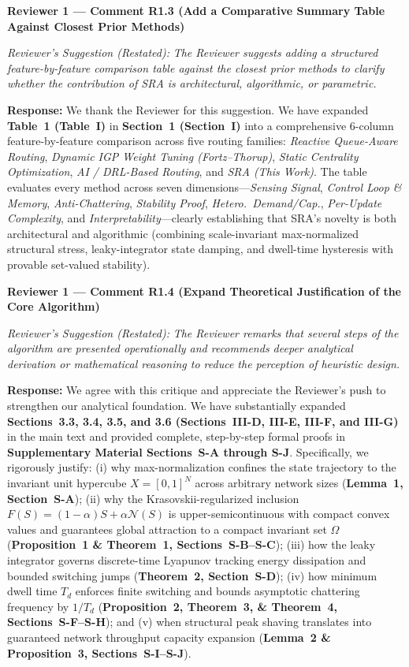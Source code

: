 \documentclass[11pt,a4paper]{article}
\newcommand{\cbox}[2]{%
  \vspace{0.6em}\noindent\textbf{#1}\par\smallskip
  \noindent\textit{Reviewer's Suggestion (Restated):} \textit{#2}\par\smallskip
}
\begin{document}
\hrulefill

\cbox{Reviewer 1 --- Comment R1.3 (Add a Comparative Summary Table Against Closest Prior Methods)}{The Reviewer suggests adding a structured feature-by-feature comparison table against the closest prior methods to clarify whether the contribution of SRA is architectural, algorithmic, or parametric.}

\noindent\textbf{Response:} We thank the Reviewer for this suggestion. We have expanded \textbf{Table~1 (Table~I)} in \textbf{Section~1 (Section~I)} into a comprehensive 6-column feature-by-feature comparison across five routing families: \textit{Reactive Queue-Aware Routing}, \textit{Dynamic IGP Weight Tuning (Fortz--Thorup)}, \textit{Static Centrality Optimization}, \textit{AI / DRL-Based Routing}, and \textit{SRA (This Work)}. The table evaluates every method across seven dimensions---\textit{Sensing Signal}, \textit{Control Loop \& Memory}, \textit{Anti-Chattering}, \textit{Stability Proof}, \textit{Hetero.\ Demand/Cap.}, \textit{Per-Update Complexity}, and \textit{Interpretability}---clearly establishing that SRA's novelty is both architectural and algorithmic (combining scale-invariant max-normalized structural stress, leaky-integrator state damping, and dwell-time hysteresis with provable set-valued stability).

\hrulefill

\cbox{Reviewer 1 --- Comment R1.4 (Expand Theoretical Justification of the Core Algorithm)}{The Reviewer remarks that several steps of the algorithm are presented operationally and recommends deeper analytical derivation or mathematical reasoning to reduce the perception of heuristic design.}

\noindent\textbf{Response:} We agree with this critique and appreciate the Reviewer's push to strengthen our analytical foundation. We have substantially expanded \textbf{Sections~3.3, 3.4, 3.5, and 3.6 (Sections~III-D, III-E, III-F, and III-G)} in the main text and provided complete, step-by-step formal proofs in \textbf{Supplementary Material Sections~S-A through S-J}. Specifically, we rigorously justify: (i) why max-normalization confines the state trajectory to the invariant unit hypercube $X=[0,1]^N$ across arbitrary network sizes (\textbf{Lemma~1, Section~S-A}); (ii) why the Krasovskii-regularized inclusion $F(S)=(1-\alpha)S+\alpha\mathcal{N}(S)$ is upper-semicontinuous with compact convex values and guarantees global attraction to a compact invariant set $\Omega$ (\textbf{Proposition~1 \& Theorem~1, Sections~S-B--S-C}); (iii) how the leaky integrator governs discrete-time Lyapunov tracking energy dissipation and bounded switching jumps (\textbf{Theorem~2, Section~S-D}); (iv) how minimum dwell time $T_d$ enforces finite switching and bounds asymptotic chattering frequency by $1/T_d$ (\textbf{Proposition~2, Theorem~3, \& Theorem~4, Sections~S-F--S-H}); and (v) when structural peak shaving translates into guaranteed network throughput capacity expansion (\textbf{Lemma~2 \& Proposition~3, Sections~S-I--S-J}).
\end{document}
